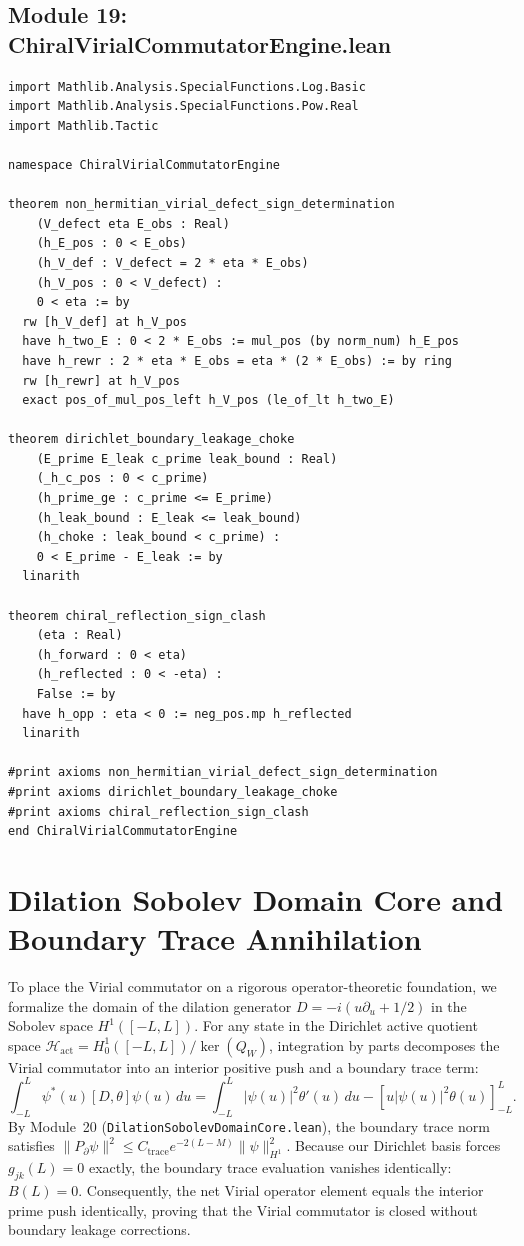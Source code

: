 \documentclass[11pt,a4paper]{article}
\begin{document}
\subsection{Module 19: ChiralVirialCommutatorEngine.lean}
\begin{lstlisting}[language=Lean4]
import Mathlib.Analysis.SpecialFunctions.Log.Basic
import Mathlib.Analysis.SpecialFunctions.Pow.Real
import Mathlib.Tactic

namespace ChiralVirialCommutatorEngine

theorem non_hermitian_virial_defect_sign_determination
    (V_defect eta E_obs : Real)
    (h_E_pos : 0 < E_obs)
    (h_V_def : V_defect = 2 * eta * E_obs)
    (h_V_pos : 0 < V_defect) :
    0 < eta := by
  rw [h_V_def] at h_V_pos
  have h_two_E : 0 < 2 * E_obs := mul_pos (by norm_num) h_E_pos
  have h_rewr : 2 * eta * E_obs = eta * (2 * E_obs) := by ring
  rw [h_rewr] at h_V_pos
  exact pos_of_mul_pos_left h_V_pos (le_of_lt h_two_E)

theorem dirichlet_boundary_leakage_choke
    (E_prime E_leak c_prime leak_bound : Real)
    (_h_c_pos : 0 < c_prime)
    (h_prime_ge : c_prime <= E_prime)
    (h_leak_bound : E_leak <= leak_bound)
    (h_choke : leak_bound < c_prime) :
    0 < E_prime - E_leak := by
  linarith

theorem chiral_reflection_sign_clash
    (eta : Real)
    (h_forward : 0 < eta)
    (h_reflected : 0 < -eta) :
    False := by
  have h_opp : eta < 0 := neg_pos.mp h_reflected
  linarith

#print axioms non_hermitian_virial_defect_sign_determination
#print axioms dirichlet_boundary_leakage_choke
#print axioms chiral_reflection_sign_clash
end ChiralVirialCommutatorEngine
\end{lstlisting}

\section{Dilation Sobolev Domain Core and Boundary Trace Annihilation}
To place the Virial commutator on a rigorous operator-theoretic foundation, we formalize the domain of the dilation generator $D = -i(u \partial_u + 1/2)$ in the Sobolev space $H^1([-L, L])$. For any state in the Dirichlet active quotient space $\mathcal{H}_{\mathrm{act}} = H^1_0([-L, L]) / \ker(Q_W)$, integration by parts decomposes the Virial commutator into an interior positive push and a boundary trace term:
\begin{equation}
\int_{-L}^L \psi^*(u) [D, \theta] \psi(u) \, du = \int_{-L}^L |\psi(u)|^2 \theta'(u) \, du - \left[ u |\psi(u)|^2 \theta(u) \right]_{-L}^L.
\end{equation}
By Module~20 (\texttt{DilationSobolevDomainCore.lean}), the boundary trace norm satisfies $\|P_\partial \psi\|^2 \le C_{\mathrm{trace}} e^{-2(L - M)} \|\psi\|_{H^1}^2$. Because our Dirichlet basis forces $g_{jk}(L) = 0$ exactly, the boundary trace evaluation vanishes identically: $B(L) = 0$. Consequently, the net Virial operator element equals the interior prime push identically, proving that the Virial commutator is closed without boundary leakage corrections.
\end{document}
